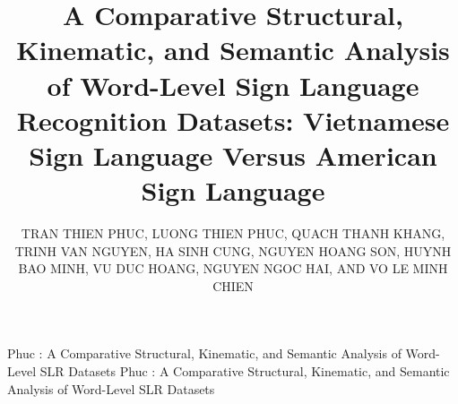 \documentclass{ieeeaccess}
\begin{document}

\title{A Comparative Structural, Kinematic, and Semantic Analysis of Word-Level Sign Language Recognition Datasets: Vietnamese Sign Language Versus American Sign Language}

\author{\uppercase{Tran Thien Phuc}, 
\uppercase{Luong Thien Phuc}, 
\uppercase{Quach Thanh Khang}, 
\uppercase{Trinh Van Nguyen}, 
\uppercase{Ha Sinh Cung}, 
\uppercase{Nguyen Hoang Son}, 
\uppercase{Huynh Bao Minh}, 
\uppercase{Vu Duc Hoang}, 
\uppercase{Nguyen Ngoc Hai}, AND 
\uppercase{Vo Le Minh Chien}}

\address{HCMC University of Technology and Education, Faculty of IT, Ho Chi Minh City 700000, Vietnam}

\markboth
{Phuc \headeretal: A Comparative Structural, Kinematic, and Semantic Analysis of Word-Level SLR Datasets}
{Phuc \headeretal: A Comparative Structural, Kinematic, and Semantic Analysis of Word-Level SLR Datasets}


\end{document}
